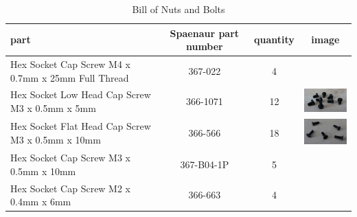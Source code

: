 \documentclass[12pt,titlepage,oneside]{memoir}
\begin{document}
\begin{table}[!h]
\begin{tabular}{p{5cm} | c | c | c }
part & Spaenaur part number & quantity & image \\
\hline
Hex Socket Cap Screw M4 x 0.7mm x 25mm Full Thread & 367-022 & 4 & \\
Hex Socket Low Head Cap Screw M3 x 0.5mm x 5mm	& 366-1071 & 12 &\includegraphics[width=80px]{hw/M3X06LHC.jpg} \\
Hex Socket Flat Head Cap Screw M3 x 0.5mm x 10mm & 366-566 & 18 & \includegraphics[width=80px]{hw/M3X10FC.jpg}\\
Hex Socket Cap Screw M3 x 0.5mm x 10mm & 367-B04-1P	& 5 & \\
Hex Socket Cap Screw M2 x 0.4mm x 6mm	& 366-663 & 4 & \\
\end{tabular}
\caption{Bill of Nuts and Bolts}
\label{table:screws}
\end{table}
\end{document}
